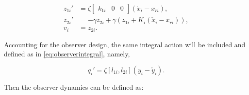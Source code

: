 \documentclass[../main.tex]{subfiles}
\begin{document}
		\begin{align}
		z_{1i}' &= \zeta \begin{bmatrix} 
		k_{1i} & 0 & 0
		\end{bmatrix}(\check{x}_i - x_{ri}), \\
		z_{2i}' &= -\gamma z_{2i}  + \gamma (z_{1i} + K_i(\check{x}_i - x_{ri})), \\
		v_i &= z_{2i}.
		\end{align}

Accounting for the observer design, the same integral action will be included and defined as in \eqref{eq:observerintegral}, namely,

	\begin{equation}
	q_i' = \zeta[l_{1i},l_{2i}](y_i - \check{y}_i). \label{eq:observerintegral2} \nonumber
	\end{equation} 
	 
Then the observer dynamics can be defined as:
\end{document}
